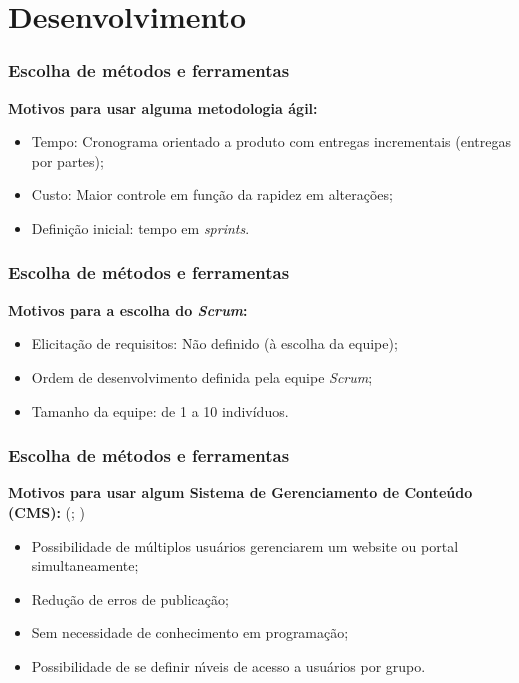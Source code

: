 \documentclass{beamer}
\begin{document}
\section{Desenvolvimento}
\begin{frame}
    \frametitle{Escolha de métodos e ferramentas}
    \textbf{Motivos para usar alguma metodologia ágil:} \cite{dos2013metodologias}
    \begin{itemize}
        \item Tempo: Cronograma orientado a produto com entregas incrementais (entregas por partes);
        \item Custo: Maior controle em função da rapidez em alterações; %
        \item Definição inicial: tempo em \textit{sprints}.
    \end{itemize}
    
\end{frame}

\begin{frame}
 \frametitle{Escolha de métodos e ferramentas}
    \textbf{Motivos para a escolha do \textit{Scrum}:} \cite{anwer2017comparative}
    \begin{itemize}
        \item Elicitação de requisitos: Não definido (à escolha da equipe); %
        \item Ordem de desenvolvimento definida pela equipe \textit{Scrum}; %
        \item Tamanho da equipe: de 1 a 10 indivíduos. %
    \end{itemize}
\end{frame}



\begin{frame}
    \frametitle{Escolha de métodos e ferramentas}
    \textbf{Motivos para usar algum Sistema de Gerenciamento de Conteúdo (CMS):} (; )
    \begin{itemize}
        \item Possibilidade de múltiplos usuários gerenciarem um website ou portal simultaneamente;
        \item Redução de erros de publicação; %
        \item Sem necessidade de conhecimento em programação; %
        \item Possibilidade de se definir nı́veis de acesso a usuários por grupo. %
    \end{itemize}
\end{frame}
\end{document}
